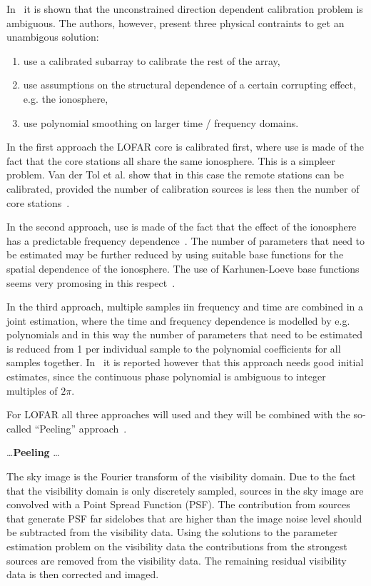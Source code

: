 \documentclass[journal]{IEEEtran}
\begin{document}
In~\cite{Tol:07} it is shown that the unconstrained direction dependent calibration problem is ambiguous. The authors, however, present three physical contraints to get an unambigous solution: 
%
\begin{enumerate}
\item use a calibrated subarray to calibrate the rest of the array,
\item use assumptions on the structural dependence of a certain corrupting effect, e.g. the ionosphere,
\item use polynomial smoothing on larger time / frequency domains.
\end{enumerate}
% 

In the first approach the LOFAR core is calibrated first, where use is made of the fact that the core stations all share the same ionosphere. This is a simpleer problem. Van der Tol et al. show that in this case the remote stations can be calibrated, provided the number of calibration sources is less then the number of core stations~\cite{Tol:07,Tol:05}. 

In the second approach, use is made of the fact that the effect of the ionosphere has a predictable frequency dependence~\cite{Tol:05}. The number of parameters that need to be estimated may be further reduced by using suitable base functions for the spatial dependence of the ionosphere. The use of Karhunen-Loeve base functions seems very promosing in this respect~\cite{Tol2:07}.  

In the third approach, multiple samples iin frequency and time are combined in a joint estimation, where the time and frequency dependence is modelled by e.g. polynomials and in this way the number of parameters that need to be estimated is reduced from 1 per individual sample to the polynomial coefficients for all samples together. In~\cite{Tol:07} it is reported however that this approach needs good initial estimates, since the continuous phase polynomial is ambiguous to integer multiples of $2\pi$.

For LOFAR all three approaches will used and they will be combined with the so-called ``Peeling'' approach~\cite{Noordam:04,Tol:07}.

\ldots {\bf Peeling} \ldots

The sky image is the Fourier transform of the visibility domain. Due to the fact that the visibility domain is only discretely sampled, sources in the sky image are convolved with a Point Spread Function (PSF). The contribution from sources that generate PSF far sidelobes that are higher than the image noise level should be subtracted from the visibility data. Using the solutions to the parameter estimation problem on the visibility data the contributions from the strongest sources are removed from the visibility data. The remaining residual visibility data is then corrected and imaged.
\end{document}
